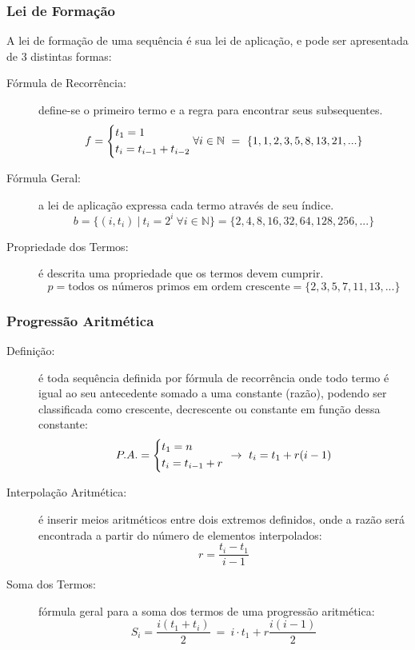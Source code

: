     \subsubsection{Lei de Formação}
        A lei de formação de uma sequência é sua lei de aplicação, e pode ser apresentada de 3 distintas formas:
        \begin{description}
            \item[Fórmula de Recorrência:] define-se o primeiro termo e a regra para encontrar seus subsequentes. \eg
            \[ f = \begin{dcases} t_1 = 1 \\ t_i = t_{i-1} + t_{i-2} \end{dcases} \forall i \in \mathbb{N} \ = \ \{1,1,2,3,5,8,13,21,...\} \]
            \item[Fórmula Geral:] a lei de aplicação expressa cada termo através de seu índice. \eg
            \[ b = \{ (i,t_i) \ | \ t_i = 2^i \ \forall i \in \mathbb{N} \} = \{2,4,8,16,32,64,128,256,...\} \]
            \item[Propriedade dos Termos:] é descrita uma propriedade que os termos devem cumprir. \eg
            \[ p = \text{todos os números primos em ordem crescente} = \{2,3,5,7,11,13,...\} \]
        \end{description}
    \subsubsection{Progressão Aritmética}
        \begin{description}
            \item[Definição:] é toda sequência definida por fórmula de recorrência onde todo termo é igual ao seu antecedente somado a uma constante (razão), podendo ser classificada como crescente, decrescente ou constante em função dessa constante:
            \[ P.A. = \begin{dcases} t_1 = n \\ t_i = t_{i-1} + r \end{dcases} \ \rightarrow \ t_i = t_1 + r(i-1) \]
            \item[Interpolação Aritmética:] é inserir meios aritméticos entre dois extremos definidos, onde a razão será encontrada a partir do número de elementos interpolados:
            \[ r = \frac{t_i - t_1}{i - 1} \]
            \item[Soma dos Termos:] fórmula geral para a soma dos termos de uma progressão aritmética:
            \[ S_i = \frac{i(t_1 + t_i)}{2} \ = \ i \cdot t_1 + r \frac{i(i-1)}{2} \]
        \end{description}
